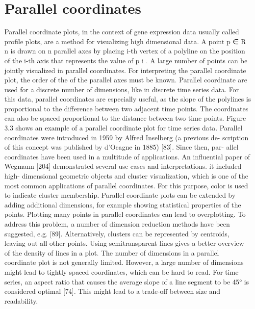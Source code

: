 \section{Parallel coordinates}
Parallel coordinate plots, in the context of gene expression data usually called profile
plots, are a method for visualizing high dimensional data. A point p ∈ R n is drawn on
n parallel axes by placing i-th vertex of a polyline on the position of the i-th axis that
represents the value of p i . A large number of points can be jointly visualized in parallel
coordinates. For interpreting the parallel coordinate plot, the order of the of the parallel
axes must be known. Parallel coordinate are used for a discrete number of dimensions,
like in discrete time series data. For this data, parallel coordinates are especially useful,
as the slope of the polylines is proportional to the difference between two adjacent time
points. The coordinates can also be spaced proportional to the distance between two
time points. Figure 3.3 shows an example of a parallel coordinate plot for time series
data.
Parallel coordinates were introduced in 1959 by Alfred Inselberg (a previous de-
scription of this concept was published by d’Ocagne in 1885) [83]. Since then, par-
allel coordinates have been used in a multitude of applications. An influential paper
of Wegmann [204] demonstrated several use cases and interpretations. it included high-
dimensional geometric objects and cluster visualization, which is one of the most common
applications of parallel coordinates. For this purpose, color is used to indicate cluster
membership. Parallel coordinate plots can be extended by adding additional dimensions,
for example showing statistical properties of the points.
Plotting many points in parallel coordinates can lead to overplotting. To address
this problem, a number of dimension reduction methods have been suggested, e.g. [89].
Alternatively, clusters can be represented by centroids, leaving out all other points.
Using semitransparent lines gives a better overview of the density of lines in a plot. The
number of dimensions in a parallel coordinate plot is not generally limited. However, a
large number of dimensions might lead to tightly spaced coordinates, which can be hard
to read. For time series, an aspect ratio that causes the average slope of a line segment
to be 45° is considered optimal [74]. This might lead to a trade-off between size and
readability.

